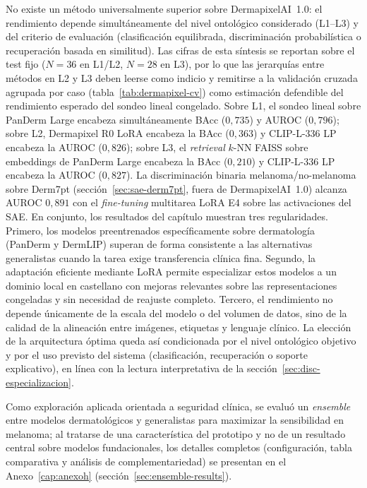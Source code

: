 No existe un método universalmente superior sobre DermapixelAI~1.0: el
rendimiento depende simultáneamente del nivel ontológico considerado
(L1--L3) y del criterio de evaluación (clasificación equilibrada,
discriminación probabilística o recuperación basada en similitud). Las
cifras de esta síntesis se reportan
sobre el test fijo ($N = 36$ en L1/L2, $N = 28$ en L3), por lo que las
jerarquías entre métodos en L2 y L3 deben leerse como indicio y
remitirse a la validación cruzada agrupada por caso
(tabla~\ref{tab:dermapixel-cv}) como estimación defendible del
rendimiento esperado del sondeo lineal congelado. Sobre L1, el sondeo
lineal sobre PanDerm Large encabeza simultáneamente BAcc ($0{,}735$) y
AUROC ($0{,}796$); sobre L2, Dermapixel R0 LoRA encabeza la BAcc
($0{,}363$) y CLIP-L-336 LP encabeza la AUROC ($0{,}826$); sobre
L3, el \emph{retrieval} $k$-NN FAISS sobre embeddings de PanDerm
Large encabeza la BAcc ($0{,}210$) y CLIP-L-336 LP encabeza la
AUROC ($0{,}827$). La discriminación binaria melanoma/no-melanoma
sobre Derm7pt (sección~\ref{sec:sae-derm7pt}, fuera de
DermapixelAI~1.0) alcanza AUROC $0{,}891$ con el \emph{fine-tuning}
multitarea LoRA E4 sobre las activaciones del SAE. En conjunto, los resultados del capítulo muestran tres regularidades.
Primero, los modelos preentrenados específicamente sobre dermatología
(PanDerm y DermLIP) superan de forma consistente a las alternativas
generalistas cuando la tarea exige transferencia clínica fina. Segundo,
la adaptación eficiente mediante LoRA permite especializar estos modelos
a un dominio local en castellano con mejoras relevantes sobre las
representaciones congeladas y sin necesidad de reajuste completo.
Tercero, el rendimiento no depende únicamente de la escala del modelo o
del volumen de datos, sino de la calidad de la alineación entre
imágenes, etiquetas y lenguaje clínico. La elección de la arquitectura
óptima queda así condicionada por el nivel ontológico objetivo y por el
uso previsto del sistema (clasificación, recuperación o soporte
explicativo), en línea con la lectura interpretativa de la
sección~\ref{sec:disc-especializacion}.

Como exploración aplicada orientada a seguridad clínica, se evaluó un
\emph{ensemble} entre modelos dermatológicos y generalistas para
maximizar la sensibilidad en melanoma; al tratarse de una característica
del prototipo y no de un resultado central sobre modelos fundacionales,
los detalles completos (configuración, tabla comparativa y análisis de
complementariedad) se presentan en el Anexo~\ref{cap:anexoh}
(sección~\ref{sec:ensemble-results}).
